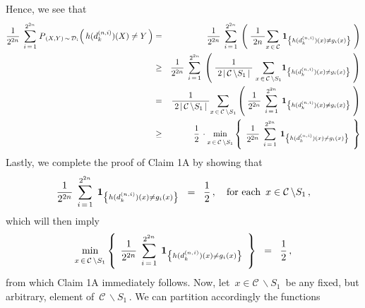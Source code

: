 Hence, we see that
\begin{eqnarray*}
\dfrac{1}{2^{2n}}\;\,
\overset{2^{2n}}{\underset{i\,=\,1}{\sum}}\;
P_{\,(X,Y)\,\sim\,\mathcal{D}_{i}}\!\left(\,h(d^{(n,i)}_{k})(X) \overset{{\color{white}.}}{\neq} Y\,\right)
& = &
	\dfrac{1}{2^{2n}}\;\,
	\overset{2^{2n}}{\underset{i\,=\,1}{\sum}}\;
	\left(\;
		\dfrac{1}{{\color{white}.}2n{\color{white}.}}
		\underset{x\,\in\,\mathcal{C}}{\sum}\; \mathbf{1}_{\left\{h(d^{(n,i)}_{k})(x) \neq g_{i}(x)\right\}}
		\;\right)
\\
& \geq &
	\dfrac{1}{2^{2n}}\;\,
	\overset{2^{2n}}{\underset{i\,=\,1}{\sum}}\;
	\left(\;
		\dfrac{1}{{\color{white}.}2\,\vert\,\mathcal{C}\,\backslash S_{1}\,\vert{\color{white}.}}\;
		\underset{x\,\in\,\mathcal{C}\,\backslash S_{1}}{\sum} \mathbf{1}_{\left\{h(d^{(n,i)}_{k})(x) \neq g_{i}(x)\right\}}
		\;\right)
\\
& = &
	\dfrac{1}{{\color{white}.}2\,\vert\,\mathcal{C}\,\backslash S_{1}\,\vert{\color{white}.}}
	\underset{x\,\in\,\mathcal{C}\,\backslash S_{1}}{\sum}
	\left(\;
		\dfrac{1}{2^{2n}}\;\,
		\overset{2^{2n}}{\underset{i\,=\,1}{\sum}}\;\,
		\mathbf{1}_{\left\{h(d^{(n,i)}_{k})(x) \neq g_{i}(x)\right\}}
		\;\right)
\\
& \geq &
	\dfrac{1}{2}\,\cdot
	\underset{x\,\overset{{\color{white}.}}{\in}\,\mathcal{C}\,\backslash S_{1}}{\min}
	\left\{\;\,
		\dfrac{1}{2^{2n}}\;\,
		\overset{2^{2n}}{\underset{i\,=\,1}{\sum}}\;\,
		\mathbf{1}_{\left\{h(d^{(n,i)}_{k})(x) \neq g_{i}(x)\right\}}
		\,\;\right\}
\end{eqnarray*}
Lastly, we complete the proof of Claim 1A by showing that
\begin{equation*}
\dfrac{1}{2^{2n}}\;\,
\overset{2^{2n}}{\underset{i\,=\,1}{\sum}}\;\,
\mathbf{1}_{\left\{h(d^{(n,i)}_{k})(x) \neq g_{i}(x)\right\}}
\;\; = \;\;
	\dfrac{1}{2}\,,
\quad
\textnormal{for each \,$x \in \mathcal{C}\,\backslash S_{1}$}\,,
\end{equation*}
which will then imply
\begin{equation*}
\underset{x\,\overset{{\color{white}.}}{\in}\,\mathcal{C}\,\backslash S_{1}}{\min}
\left\{\;\,
	\dfrac{1}{2^{2n}}\;\,
	\overset{2^{2n}}{\underset{i\,=\,1}{\sum}}\;\,
	\mathbf{1}_{\left\{h(d^{(n,i)}_{k})(x) \neq g_{i}(x)\right\}}
	\,\;\right\}
\;\; = \;\;
	\dfrac{1}{2}\,,
\end{equation*}
from which Claim 1A immediately follows.
Now, let \,$x \in \mathcal{C}\,\backslash S_{1}$\, be any fixed, but arbitrary, element
of \,$\mathcal{C}\,\backslash S_{1}$\,. We can partition accordingly the functions
